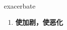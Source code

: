 
\begin{frame}
{\huge exacerbate}
\begin{center}
\begin{enumerate}\Large
  \item \textbf{使加剧，使恶化}
\end{enumerate}
\end{center}
\end{frame}
